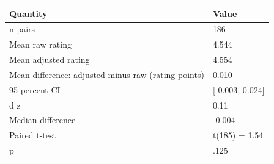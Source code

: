 \begin{table}[ht]
\centering
\begingroup\footnotesize
\begin{tabular}{ll}
  \toprule
Quantity & Value \\ 
  \midrule
n pairs & 186 \\ 
  Mean raw rating & 4.544 \\ 
  Mean adjusted rating & 4.554 \\ 
  Mean difference: adjusted minus raw (rating points) & 0.010 \\ 
  95 percent CI & [-0.003, 0.024] \\ 
  d z & 0.11 \\ 
  Median difference & -0.004 \\ 
  Paired t-test & t(185) = 1.54 \\ 
  p & .125 \\ 
   \bottomrule
\end{tabular}
\endgroup
\end{table}
